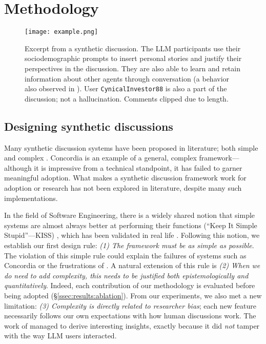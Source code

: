 %

\section{Methodology}
\label{sec:methodology}

\begin{figure*}[t]
	\centering
	\texttt{[image: example.png]}
	\caption{Excerpt from a synthetic discussion. The LLM participants use their sociodemographic prompts to insert personal stories and justify their perspectives in the discussion. They are also able to learn and retain information about other agents through conversation (a behavior also observed in \citet{park2023game}). User \texttt{CynicalInvestor88} is also a part of the discussion; not a hallucination. Comments clipped due to length.}
	\label{fig::example}
\end{figure*}


\subsection{Designing synthetic discussions}
\label{ssec:methodology:design}

Many synthetic discussion systems have been proposed in literature; both simple \citep{Tsai_Deliberate_Lab_Open-Source_2025, ulmer2024} and complex \citep{balog_2024, abdelnabi_negotiations, park2023game}. Concordia \citep{Vezhnevets2023GenerativeAM} is an example of a general, complex framework---although it is impressive from a technical standpoint, it has failed to garner meaningful adoption. What makes a synthetic discussion framework work for adoption or research has not been explored in literature, despite many such implementations.

In the field of Software Engineering, there is a widely shared notion that simple systems are almost always better at performing their functions (``Keep It Simple Stupid''---KISS) \citep{beck2000extreme, thomas2025simplicity}, which has been validated in real life \citep{banker1989software, ogheneovo2014relationship}. Following this notion, we establish our first design rule: \emph{(1) The framework must be as simple as possible}. The violation of this simple rule could explain the failures of systems such as Concordia or the frustrations of \citet{balog_2024}. A natural extension of this rule is \emph{(2) When we do need to add complexity, this needs to be justified both epistemologically and quantitatively}. Indeed, each contribution of our methodology is evaluated before being adopted (\S\ref{ssec:results:ablation}). From our experiments, we also met a new limitation: \emph{(3) Complexity is directly related to researcher bias}; each new feature necessarily follows our own expectations with how human discussions work. The work of \citet{park2023game} managed to derive interesting insights, exactly because it did \emph{not} tamper with the way LLM users interacted.

